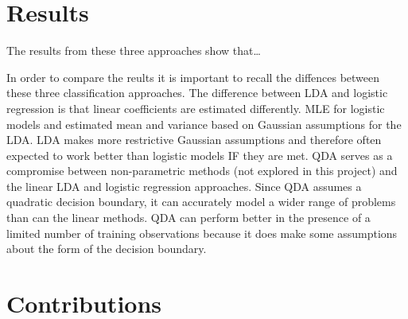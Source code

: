 \documentclass[]{article}
\begin{document}
\section{Results}\label{results}

The results from these three approaches show that\ldots{}

In order to compare the reults it is important to recall the diffences
between these three classification approaches. The difference between
LDA and logistic regression is that linear coefficients are estimated
differently. MLE for logistic models and estimated mean and variance
based on Gaussian assumptions for the LDA. LDA makes more restrictive
Gaussian assumptions and therefore often expected to work better than
logistic models IF they are met. QDA serves as a compromise between
non-parametric methods (not explored in this project) and the linear LDA
and logistic regression approaches. Since QDA assumes a quadratic
decision boundary, it can accurately model a wider range of problems
than can the linear methods. QDA can perform better in the presence of a
limited number of training observations because it does make some
assumptions about the form of the decision boundary.

\section{Contributions}\label{contributions}
\end{document}
